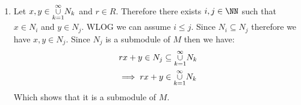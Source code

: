 \begin{enumerate}[label=]
    \item
        Let $x, y \in \overunderset{\infty}{k = 1}{\cup}N_k$ and $r \in R$. Therefore there exists $i, j \in \NN$ such that $x \in N_i$ and $y \in N_j$. WLOG we can assume $i \le j$. Since $N_i \subseteq N_j$ therefore we have $x, y \in N_j$. Since $N_j$ is a submodule of $M$ then we have:
        \begin{gather*}
            rx + y \in N_j \subseteq \overunderset{\infty}{k = 1}{\cup} N_k \\
            \implies rx + y \in \overunderset{\infty}{k = 1}{\cup} N_k
        \end{gather*}
        Which shows that it is a submodule of $M$.
\end{enumerate}